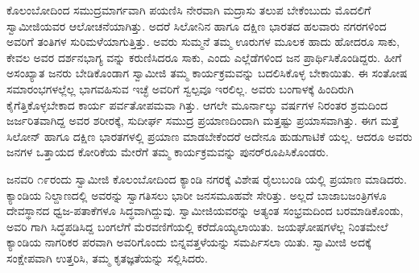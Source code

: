 ಕೊಲಂಬೋದಿಂದ ಸಮುದ್ರಮಾರ್ಗವಾಗಿ ಪಯಣಿಸಿ ನೇರವಾಗಿ ಮದ್ರಾಸು ತಲುಪ ಬೇಕೆಂಬುದು ಮೊದಲಿಗೆ ಸ್ವಾಮೀಜಿಯವರ ಆಲೋಚನೆಯಾಗಿತ್ತು. ಅದರೆ ಸಿಲೋನಿನ ಹಾಗೂ ದಕ್ಷಿಣ ಭಾರತದ ಹಲವಾರು ನಗರಗಳಿಂದ ಅವರಿಗೆ ತಂತಿಗಳ ಸುರಿಮಳೆಯಾಗುತ್ತಿತ್ತು. ಅವರು ಸುಮ್ಮನೆ ತಮ್ಮ ಊರುಗಳ ಮೂಲಕ ಹಾದು ಹೋದರೂ ಸಾಕು, ಕೇವಲ ಅವರ ದರ್ಶನಭಾಗ್ಯ ವನ್ನು ಕರುಣಿಸಿದರೂ ಸಾಕು, ಎಂದು ಎಲ್ಲೆಡೆಗಳಿಂದ ಜನ ಪ್ರಾರ್ಥಿಸಿಕೊಂಡಿದ್ದರು. ಹೀಗೆ ಅಸಂಖ್ಯಾತ ಜನರು ಬೇಡಿಕೊಂಡಾಗ ಸ್ವಾಮೀಜಿ ತಮ್ಮ ಕಾರ್ಯಕ್ರಮವನ್ನು ಬದಲಿಸಿಕೊಳ್ಳ ಬೇಕಾಯಿತು. ಈ ಸಂತೋಷ ಸಮಾರಂಭಗಳಲ್ಲೆಲ್ಲ ಭಾಗವಹಿಸುವ ಇಚ್ಛೆ ಅವರಿಗೆ ಸ್ವಲ್ಪವೂ ಇರಲಿಲ್ಲ. ಅವರು ಬಂಗಾಳಕ್ಕೆ ಹಿಂದಿರುಗಿ ಕೈಗೆತ್ತಿಕೊಳ್ಳಬೇಕಾದ ಕಾರ್ಯ ಪರ್ವತೋಪಮವಾ ಗಿತ್ತು. ಆಗಲೇ ಮೂರ್ನಾಲ್ಕು ವರ್ಷಗಳ ನಿರಂತರ ಶ್ರಮದಿಂದ ಜರ್ಜರಿತವಾಗಿದ್ದ ಅವರ ಶರೀರಕ್ಕೆ, ಸುದೀರ್ಘ ಸಮುದ್ರ ಪ್ರಯಾಣದಿಂದಾಗಿ ಮತ್ತಷ್ಟು ಪ್ರಯಾಸವಾಗಿತ್ತು. ಈಗ ಮತ್ತೆ ಸಿಲೋನ್ ಹಾಗೂ ದಕ್ಷಿಣ ಭಾರತಗಳಲ್ಲಿ ಪ್ರಯಾಣ ಮಾಡಬೇಕೆಂದರೆ ಅದೇನೂ ಹುಡುಗಾಟಿಕೆ ಯಲ್ಲ. ಆದರೂ ಅವರು ಜನಗಳ ಒತ್ತಾಯದ ಕೋರಿಕೆಯ ಮೇರೆಗೆ ತಮ್ಮ ಕಾರ್ಯಕ್ರಮವನ್ನು ಪುನರ್​ರೂಪಿಸಿಕೊಂಡರು. 

ಜನವರಿ ೧೯ರಂದು ಸ್ವಾಮೀಜಿ ಕೊಲಂಬೋದಿಂದ ಕ್ಯಾಂಡಿ ನಗರಕ್ಕೆ ವಿಶೇಷ ರೈಲುಬಂಡಿ ಯಲ್ಲಿ ಪ್ರಯಾಣ ಮಾಡಿದರು. ಕ್ಯಾಂಡಿಯ ನಿಲ್ದಾಣದಲ್ಲಿ ಅವರನ್ನು ಸ್ವಾಗತಿಸಲು ಭಾರೀ ಜನಸಮೂಹವೇ ಸೇರಿತ್ತು. ಅಲ್ಲದೆ ಬಾಜಾಬಜಂತ್ರಿಗಳೂ ದೇವಸ್ಥಾನದ ಧ್ವಜ-ಪತಾಕೆಗಳೂ ಸಿದ್ಧವಾಗಿದ್ದುವು. ಸ್ವಾಮೀಜಿಯವರನ್ನು ಅತ್ಯಂತ ಸಂಭ್ರಮದಿಂದ ಬರಮಾಡಿಕೊಂಡು, ಅವರಿ ಗಾಗಿ ಸಿದ್ಧಪಡಿಸಿದ್ದ ಬಂಗಲೆಗೆ ಮೆರವಣಿಗೆಯಲ್ಲಿ ಕರೆದೊಯ್ಯಲಾಯಿತು. ಜಯಘೋಷಗಳೆಲ್ಲ ನಿಂತಮೇಲೆ ಕ್ಯಾಂಡಿಯ ನಾಗರಿಕರ ಪರವಾಗಿ ಅವರಿಗೊಂದು ಬಿನ್ನವತ್ತಳೆಯನ್ನು ಸಮರ್ಪಿಸಲಾ ಯಿತು. ಸ್ವಾಮೀಜಿ ಅದಕ್ಕೆ ಸಂಕ್ಷೇಪವಾಗಿ ಉತ್ತರಿಸಿ, ತಮ್ಮ ಕೃತಜ್ಞತೆಯನ್ನು ಸಲ್ಲಿಸಿದರು. 

